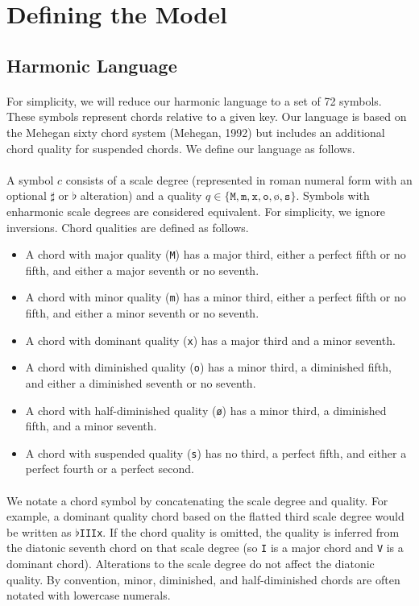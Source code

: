\documentclass[]{article}
\begin{document}
\section{Defining the Model}
\subsection{Harmonic Language}
\paragraph{}
For simplicity, we will reduce our harmonic language to a set of 72 symbols.  These symbols represent chords relative to a given key.  Our language is based on the Mehegan sixty chord system (Mehegan, 1992) but includes an additional chord quality for suspended chords.  We define our language as follows.

\paragraph{}
A symbol $c$ consists of a scale degree (represented in roman numeral form with an optional $\sharp$ or $\flat$ alteration) and a quality $q \in \{\texttt{M}, \texttt{m}, \texttt{x}, \texttt{o}, \texttt{\o}, \texttt{s}\}$.  Symbols with enharmonic scale degrees are considered equivalent.  For simplicity, we ignore inversions.  Chord qualities are defined as follows.
\begin{itemize}
	\item A chord with major quality (\texttt{M}) has a major third, either a perfect fifth or no fifth, and either a major seventh or no seventh.
	\item A chord with minor quality (\texttt{m}) has a minor third, either a perfect fifth or no fifth, and either a minor seventh or no seventh.
	\item A chord with dominant quality (\texttt{x}) has a major third and a minor seventh.
	\item A chord with diminished quality (\texttt{o}) has a minor third, a diminished fifth, and either a diminished seventh or no seventh.
	\item A chord with half-diminished quality (\texttt{\o}) has a minor third, a diminished fifth, and a minor seventh.
	\item A chord with suspended quality (\texttt{s}) has no third, a perfect fifth, and either a perfect fourth or a perfect second.
\end{itemize}

\paragraph{}
We notate a chord symbol by concatenating the scale degree and quality.  For example, a dominant quality chord based on the flatted third scale degree would be written as $\flat$\texttt{IIIx}.  If the chord quality is omitted, the quality is inferred from the diatonic seventh chord on that scale degree (so \texttt{I} is a major chord and \texttt{V} is a dominant chord).  Alterations to the scale degree do not affect the diatonic quality.  By convention, minor, diminished, and half-diminished chords are often notated with lowercase numerals.
\end{document}
